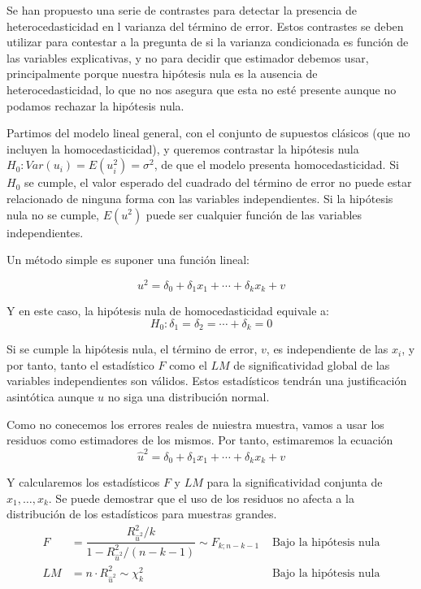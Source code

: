 

Se han propuesto una serie de contrastes para detectar la presencia de heterocedasticidad en l varianza del t\'ermino de error. Estos contrastes se deben utilizar para contestar a la pregunta de si la varianza condicionada es funci\'on de las variables explicativas, y no para decidir que estimador debemos usar, principalmente porque nuestra hip\'otesis nula es la ausencia de heterocedasticidad, lo que no nos asegura que esta no est\'e presente aunque no podamos rechazar la hip\'otesis nula.


Partimos del modelo lineal general, con el conjunto de supuestos cl\'asicos (que no incluyen la homocedasticidad), y queremos contrastar la hip\'otesis nula $H_0:Var(u_i)=E(u_i^2)=\sigma^2$, de que el modelo presenta homocedasticidad. Si $H_0$ se cumple, el valor esperado del cuadrado del t\'ermino de error no puede estar relacionado de ninguna forma con las variables independientes. Si la hip\'otesis nula no se cumple, $E(u^2)$ puede ser cualquier funci\'on de las variables independientes.

Un m\'etodo simple es suponer una funci\'on lineal:

\[u^2=\delta_0+\delta_1x_1+\cdots+\delta_kx_k+v\]

Y en este caso, la hip\'otesis nula de homocedasticidad equivale a:
\[H_0:\delta_1=\delta_2=\cdots+\delta_k=0\]

Si se cumple la hip\'otesis nula, el t\'ermino de error, $v$, es independiente de las $x_i$, y por tanto, tanto el estad\'istico $F$ como el $LM$ de significatividad global de las variables independientes son v\'alidos. Estos estad\'isticos tendr\'an una justificaci\'on asint\'otica aunque $u$ no siga una distribuci\'on normal.

Como no conecemos los errores reales de nuiestra muestra, vamos a usar los residuos como estimadores de los mismos. Por tanto, estimaremos la ecuaci\'on
\[\hat{u}^2=\delta_0+\delta_1x_1+\cdots+\delta_kx_k+v\]

Y calcularemos los estad\'isticos $F$ y $LM$ para la significatividad conjunta de $x_1,\ldots,x_k$. Se puede demostrar que el uso de los residuos no afecta a la distribuci\'on de los estad\'isticos para muestras grandes.
\begin{align*}
F&=\dfrac{R^2_{\hat{u}^2}/k}{1-R^2_{\hat{u}^2}/(n-k-1)}\sim F_{k;n-k-1}& \text{ Bajo la hip\'otesis nula}\\
LM&=n\cdot R^2_{\hat{u}^2}\sim\chi^2_{k}& \text{ Bajo la hip\'otesis nula}
\end{align*}

